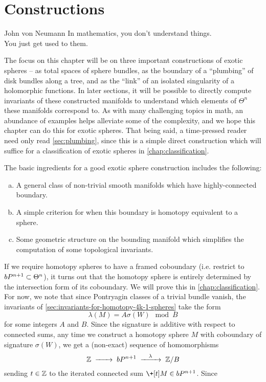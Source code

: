 \chapter{Constructions}\label{chap:constructions}
%

\begin{epigraph}{20em}{John von Neumann}
	In mathematics, you don't understand things.\\
	You just get used to them.
\end{epigraph}

The focus on this chapter will be on three important constructions of exotic spheres -- as total spaces of sphere bundles, as the boundary of a ``plumbing'' of disk bundles along a tree, and as the ``link'' of an isolated singularity of a holomorphic functions. In later sections, it will be possible to directly compute invariants of these constructed manifolds to understand which elements of $\Theta^n$ these manifolds correspond to. As with many challenging topics in math, an abundance of examples helps alleviate some of the complexity, and we hope this chapter can do this for exotic spheres.
That being said, a time-pressed reader need only read \cref{sec:plumbing}, since this is a simple direct construction which will suffice for a classification of exotic spheres in \cref{chap:classification}.

The basic ingredients for a good exotic sphere construction includes the following:
\begin{enumerate}[(a)]
	\item A general class of non-trivial smooth manifolds which have highly-connected boundary.
	\item A simple criterion for when this boundary is homotopy equivalent to a sphere.
	\item Some geometric structure on the bounding manifold which simplifies the computation of some topological invariants.
\end{enumerate}


If we require homotopy spheres to have a framed coboundary (i.e. restrict to $bP^{n+1}\subset \Theta^n$), it turns out that the homotopy sphere is entirely determined by the intersection form of its coboundary. We will prove this in \cref{chap:classification}. For now, we note that since Pontryagin classes of a trivial bundle vanish, the invariants of \cref{sec:invariants-for-homotopy-4k-1-spheres} take the form
\[
	\lambda(M) = A\sigma(W)\mod B
\]
for some integers $A$ and $B$. Since the signature is additive with respect to connected sums, any time we construct a homotopy sphere $M$ with coboundary of signature $\sigma(W)$, we get a (non-exact) sequence of homomorphisms
\[
	\Z \lkxto \bP^{n+1} \lkxto[\lambda] \Z/B
\]
sending $t\in \mathbb{Z}$ to the iterated connected sum $\+[t] M\in \bP^{n+1}$. Since $ $

